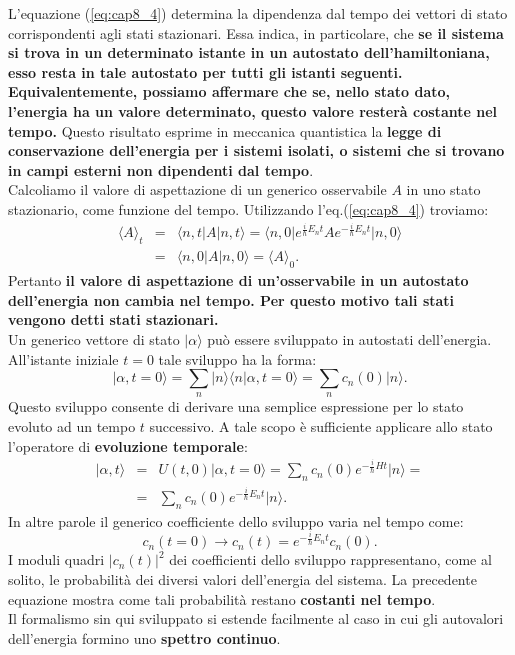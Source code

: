 \documentclass[a4paper,12pt,oneside]{book}
\begin{document}
L'equazione (\ref{eq:cap8_4}) determina la dipendenza dal tempo dei vettori di stato corrispondenti agli stati stazionari. Essa indica, in particolare, che \textbf{se il sistema si trova in un determinato istante in un autostato dell'hamiltoniana, esso resta in tale autostato per tutti gli istanti seguenti. Equivalentemente, possiamo affermare che se, nello stato dato, l'energia ha un valore determinato, questo valore resterà costante nel tempo.} Questo risultato esprime in meccanica quantistica la \textbf{legge di conservazione dell'energia per i sistemi isolati, o sistemi che si trovano in campi esterni non dipendenti dal tempo}.\\
Calcoliamo il valore di aspettazione di un generico osservabile $A$ in uno stato stazionario, come funzione del tempo. Utilizzando l'eq.(\ref{eq:cap8_4}) troviamo:
\begin{eqnarray}
\langle A \rangle _t &=& \langle n, t \vert A \vert n, t \rangle= \langle n, 0 \vert e^{\frac{i}{\hbar}E_n t}A e^{-\frac{i}{\hbar}E_n t}\vert n, 0 \rangle \nonumber \\
& = &\langle n, 0 \vert A \vert n, 0 \rangle = \langle A \rangle _0.
\end{eqnarray}
Pertanto \textbf{il valore di aspettazione di un'osservabile in un autostato dell'energia non cambia nel tempo. Per questo motivo tali stati vengono detti stati stazionari.}\\
Un generico vettore di stato $\vert \alpha \rangle $ può essere sviluppato in autostati dell'energia. All'istante iniziale $t=0$ tale sviluppo ha la forma:
\begin{equation}
\vert \alpha , t=0\rangle = \sum _n \vert n \rangle \langle n \vert \alpha, t=0 \rangle = \sum _n c_n(0)\vert n \rangle.
\end{equation}
Questo sviluppo consente di derivare una semplice espressione per lo stato evoluto ad un tempo $t$ successivo. A tale scopo è sufficiente applicare allo stato l'operatore di \textbf{evoluzione temporale}:
\begin{eqnarray}
\vert \alpha, t \rangle &=& U (t,0)\vert \alpha, t=0 \rangle = \sum _n c_n (0) e^{-\frac{i}{\hbar}H t}  \vert n \rangle = \nonumber \\
& = &\sum _n c_n (0) e^{-\frac{i}{\hbar}E_n t}  \vert n \rangle.
\end{eqnarray}
In altre parole il generico coefficiente dello sviluppo varia nel tempo come:
\begin{equation}
c_n (t=0) \rightarrow c_n(t)=e^{-\frac{i}{\hbar}E_n t} c_n (0).
\end{equation}
I moduli quadri $\vert c_n(t)\vert^2$ dei coefficienti dello sviluppo rappresentano, come al solito, le probabilità dei diversi valori dell'energia del sistema. La precedente equazione mostra come tali probabilità restano \textbf{costanti nel tempo}.\\
Il formalismo sin qui sviluppato si estende facilmente al caso in cui gli autovalori dell'energia formino uno \textbf{spettro continuo}.
\end{document}
